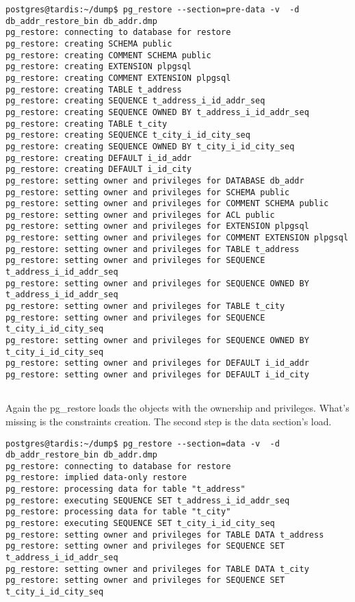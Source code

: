 \begin{verbatim}
postgres@tardis:~/dump$ pg_restore --section=pre-data -v  -d db_addr_restore_bin db_addr.dmp 
pg_restore: connecting to database for restore
pg_restore: creating SCHEMA public
pg_restore: creating COMMENT SCHEMA public
pg_restore: creating EXTENSION plpgsql
pg_restore: creating COMMENT EXTENSION plpgsql
pg_restore: creating TABLE t_address
pg_restore: creating SEQUENCE t_address_i_id_addr_seq
pg_restore: creating SEQUENCE OWNED BY t_address_i_id_addr_seq
pg_restore: creating TABLE t_city
pg_restore: creating SEQUENCE t_city_i_id_city_seq
pg_restore: creating SEQUENCE OWNED BY t_city_i_id_city_seq
pg_restore: creating DEFAULT i_id_addr
pg_restore: creating DEFAULT i_id_city
pg_restore: setting owner and privileges for DATABASE db_addr
pg_restore: setting owner and privileges for SCHEMA public
pg_restore: setting owner and privileges for COMMENT SCHEMA public
pg_restore: setting owner and privileges for ACL public
pg_restore: setting owner and privileges for EXTENSION plpgsql
pg_restore: setting owner and privileges for COMMENT EXTENSION plpgsql
pg_restore: setting owner and privileges for TABLE t_address
pg_restore: setting owner and privileges for SEQUENCE t_address_i_id_addr_seq
pg_restore: setting owner and privileges for SEQUENCE OWNED BY t_address_i_id_addr_seq
pg_restore: setting owner and privileges for TABLE t_city
pg_restore: setting owner and privileges for SEQUENCE t_city_i_id_city_seq
pg_restore: setting owner and privileges for SEQUENCE OWNED BY t_city_i_id_city_seq
pg_restore: setting owner and privileges for DEFAULT i_id_addr
pg_restore: setting owner and privileges for DEFAULT i_id_city
 
\end{verbatim}


Again the pg\_restore loads the objects with the ownership and privileges. What's missing is the 
constraints creation. The second step is the data section's load.

\begin{verbatim}
postgres@tardis:~/dump$ pg_restore --section=data -v  -d db_addr_restore_bin db_addr.dmp 
pg_restore: connecting to database for restore
pg_restore: implied data-only restore
pg_restore: processing data for table "t_address"
pg_restore: executing SEQUENCE SET t_address_i_id_addr_seq
pg_restore: processing data for table "t_city"
pg_restore: executing SEQUENCE SET t_city_i_id_city_seq
pg_restore: setting owner and privileges for TABLE DATA t_address
pg_restore: setting owner and privileges for SEQUENCE SET t_address_i_id_addr_seq
pg_restore: setting owner and privileges for TABLE DATA t_city
pg_restore: setting owner and privileges for SEQUENCE SET t_city_i_id_city_seq

\end{verbatim}

